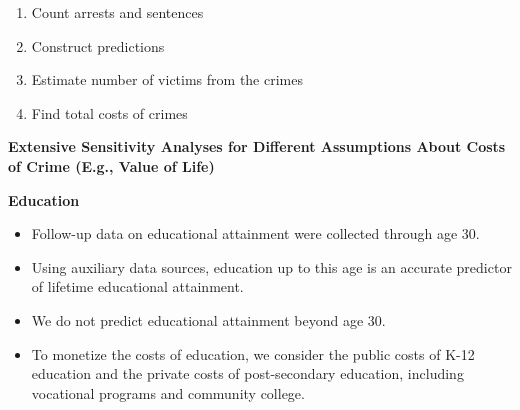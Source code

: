 \documentclass[static]{JJH-Beamer}
\begin{document}
\begin{frame}

\begin{enumerate}[1.]
\item Count arrests and sentences
\item Construct predictions
\item Estimate number of victims from the crimes
\item Find total costs of crimes
\end{enumerate}

\end{frame}

\begin{frame}

\begin{center}
\textbf{Extensive Sensitivity Analyses for Different Assumptions About Costs of Crime (E.g., Value of Life)}
\end{center}

\end{frame}

\begin{frame}

\begin{center}
\textbf{Education}
\end{center}

\end{frame}

\begin{frame}

\begin{itemize}
\item Follow-up data on educational attainment were collected through age 30.
\item Using auxiliary data sources, education up to this age is an accurate predictor of lifetime educational attainment.
\end{itemize}

\end{frame}


\begin{itemize}
\item We do not predict educational attainment beyond age 30.
\item To monetize the costs of education, we consider the public costs of K-12 education and the private costs of post-secondary education, including vocational programs and community college.
\end{itemize}
\end{document}
